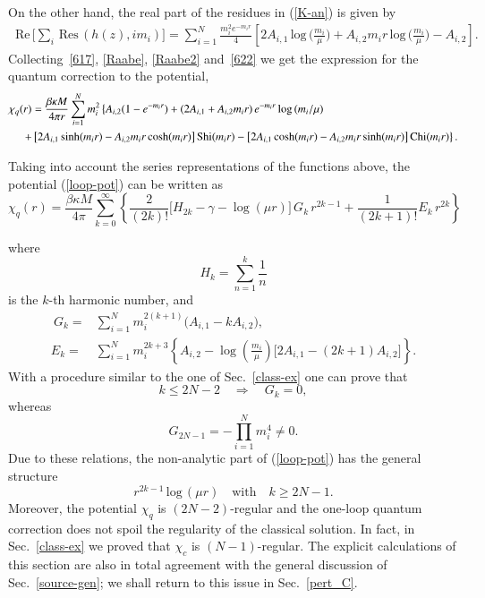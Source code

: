 \documentclass[aps,prd,a4paper,twocolumn,showpacs,showkeys,preprintnumbers,amsmath,amssymb,nofootinbib]{revtex4-2}
\numberwithin{equation}{section}
\def\beq{\begin{equation}}
\def\eeq{\end{equation}}
\def\ln{\,\mbox{log}\,}
\def\Res{\,\mbox{Res}\,}
\renewcommand{\Re}{\,\mbox{Re}\,}
\newcommand{\eq}[1]{(\ref{#1})}
\newcommand{\n}[1]{\label{#1}}
\def\be{\beta}
\def\ka{\kappa}
\begin{document}
\begin{widetext}
On the other hand, the real part of the residues in \eq{K-an} is given by
\beq
\begin{split}
\label{622}
\Re \Big[ \sum_{i} {\Res (h(z), i m_i) } \Big] =
\sum_{i=1}^N \frac{ m_i^2 e^{-m_i r}}{4}
\left[ 2 A_{i,1} \ln \Big (\frac{ m_i}{\mu } \Big)
+ A_{i,2} m_i r \ln \Big( \frac{m_i}{\mu } \Big) - A_{i,2}  \right].
\end{split}
\eeq
Collecting~\eqref{617}, \eqref{Raabe}, \eqref{Raabe2} and~\eqref{622} we get the expression for the quantum correction to the potential,
\beq
\begin{split}
\n{loop-pot}
&
\chi_q(r) =  \frac{\be \ka M}{4\pi r } \sum_{i=1}^N m_i^2
\left\lbrace 
A_{i,2} (1 - e^{-m_i r} ) + (2 A_{i,1} + A_{i,2} m_i r ) \, e^{-m_i r} \ln (m_i/\mu)   
\right.
\\
&
\left.
\hspace{4mm}
+ \, \big[ 2   A_{i,1} \sinh (m_ir) - A_{i,2} m_i r \cosh(m_i r) \big] \, \text{Shi}(m_ir)
- \big[ 2 A_{i,1} \cosh (m_i r) - A_{i,2} m_i r \sinh (m_ir) \big] \, \text{Chi}(m_ir)
\right\rbrace .
\end{split}
\eeq

Taking into account the series representations of the functions above, the potential \eq{loop-pot} can be written as
\beq \label{ChiQ-Series}
\chi_q(r) =  \frac{\be \ka M}{4\pi} \sum_{k=0}^{\infty} \left\lbrace \frac{2}{(2k)!}\Big[H_{2k}-\gamma-\log(\mu r) \Big] \, G_{k} \, r^{2k-1}+ \frac{1}{(2k+1)!} E_{k} \, r^{2k} \right\rbrace
\eeq
%
\end{widetext}
%
where
\beq
H_k = \sum_{n=1}^k \frac{1}{n}
\eeq
is the $k$-th harmonic number, and
\begin{align}
\
G_{k} =& \sum_{i=1}^N m_i^{2(k+1)}\Big(A_{i,1}-k A_{i,2} \Big) 
,
\\
E_{k} =& \sum_{i=1}^N  m_i^{2k+3} \left\lbrace A_{i,2}-\log\left( \tfrac{m_i}{\mu}\right) \big[2A_{i,1}- (2k+1)A_{i,2} \big]\right\rbrace .
\end{align}
With a procedure similar to the one of Sec.~\ref{class-ex} one can prove that
%
\beq \label{Gi-rel}
k \leqslant 2N-2 \quad \Longrightarrow \quad G_{k} = 0,
\eeq
whereas
%
\beq
G_{2N-1} = - \prod_{i=1}^N m_i^4 \neq 0.
\eeq
Due to these relations, the non-analytic part of \eq{loop-pot} has the general structure 
\begin{equation} \label{LogStruc}
r^{2k-1} \ln (\mu r) 
\quad \text{with} \quad
k \geqslant 2N-1.
\end{equation}
Moreover, the potential $\chi_q$ is $(2N-2)$-regular and the one-loop quantum correction does not spoil the regularity of the classical solution. In fact, in Sec.~\ref{class-ex} we proved that $\chi_c$ is $(N-1)$-regular.
The explicit calculations of this section are also in total agreement with the general discussion of Sec.~\ref{source-gen}; we shall return to this issue in Sec.~\ref{pert_C}.
\end{document}
